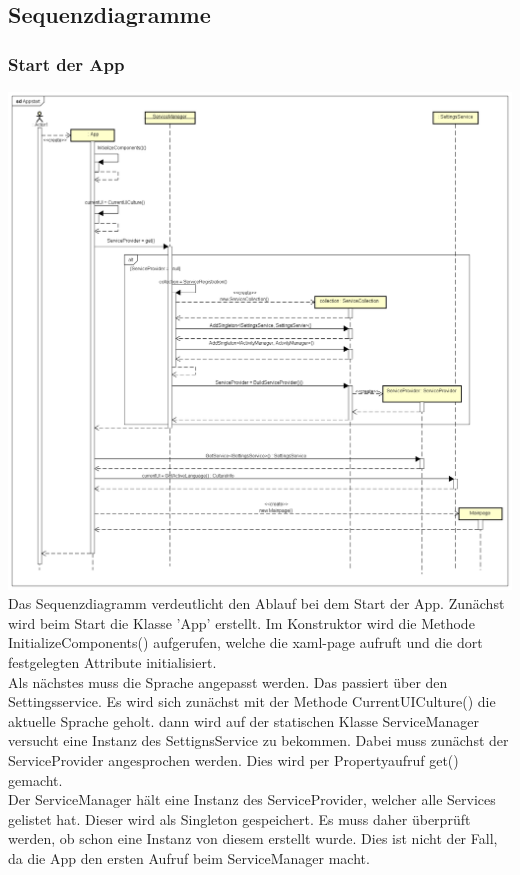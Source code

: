 \documentclass[a4paper,12pt]{article}
\begin{document}
\subsection{Sequenzdiagramme}

\subsubsection{Start der App}

\includegraphics[width=1.1\textwidth]{./Diagramme/AppstartSeqDia.png}\\
Das Sequenzdiagramm verdeutlicht den Ablauf bei dem Start der App. Zunächst wird beim Start die Klasse 'App' erstellt. 
Im Konstruktor wird die Methode InitializeComponents() aufgerufen, welche die xaml-page aufruft und die dort festgelegten Attribute initialisiert.\\
Als nächstes muss die Sprache angepasst werden. Das passiert über den Settingsservice.
Es wird sich zunächst mit der Methode CurrentUICulture() die aktuelle Sprache geholt. dann wird auf der statischen Klasse ServiceManager versucht eine Instanz des SettignsService zu bekommen. Dabei muss zunächst der ServiceProvider angesprochen werden. Dies wird per Propertyaufruf get() gemacht.\\
Der ServiceManager hält eine Instanz des ServiceProvider, welcher alle Services gelistet hat. Dieser wird als Singleton gespeichert. Es muss daher überprüft werden, ob schon eine Instanz von diesem erstellt wurde. Dies ist nicht der Fall, da die App den ersten Aufruf beim ServiceManager macht.\\
\end{document}

